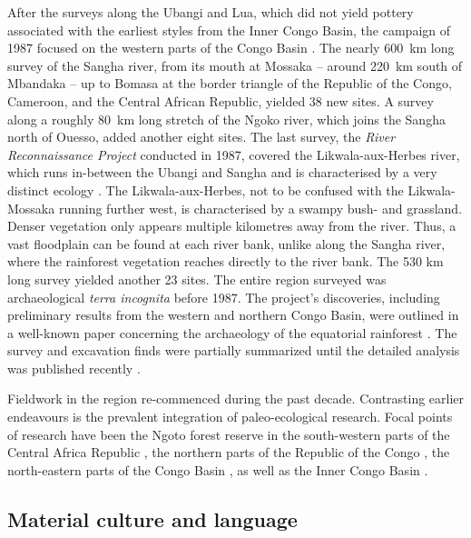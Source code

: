 \documentclass[smallextended,natbib]{svjour3}       %
\begin{document}
After the surveys along the Ubangi and Lua, which did not yield pottery associated with the earliest styles from the Inner Congo Basin, the campaign of 1987 focused on the western parts of the Congo Basin \citep[Fig.~\ref{fig:map};][]{Eggert.1992}. The nearly 600~km long survey of the Sangha river, from its mouth at Mossaka – around 220~km south of Mbandaka – up to Bomasa at the border triangle of the Republic of the Congo, Cameroon, and the Central African Republic, yielded 38 new sites. A survey along a roughly 80~km long stretch of the Ngoko river, which joins the Sangha north of Ouesso, added another eight sites. The last survey, the \textit{River Reconnaissance Project} conducted in 1987, covered the Likwala-aux-Herbes river, which runs in-between the Ubangi and Sangha and is characterised by a very distinct ecology \citep{Philippon.2019}. The Likwala-aux-Herbes, not to be confused with the Likwala-Mossaka running further west, is characterised by a swampy bush- and grassland. Denser vegetation only appears multiple kilometres away from the river. Thus, a vast floodplain can be found at each river bank, unlike along the Sangha river, where the rainforest vegetation reaches directly to the river bank. The 530 km long survey yielded another 23 sites. The entire region surveyed was archaeological \textit{terra incognita} before 1987. The project’s discoveries, including preliminary results from the western and northern Congo Basin, were outlined in a well-known paper concerning the archaeology of the equatorial rainforest \citep{Eggert.1993}. The survey and excavation finds were partially summarized \citep{Seidensticker.2016b} until the detailed analysis was published recently \citep{Seidensticker.2021e}. 

Fieldwork in the region re-commenced during the past decade. Contrasting earlier endeavours is the prevalent integration of paleo-ecological research. Focal points of research have been the Ngoto forest reserve in the south-western parts of the Central Africa Republic \citep{Kiahtipes.2011,Lupo.2015,Kiahtipes.2016,Lupo.2021}, the northern parts of the Republic of the Congo \citep{Gillet.2013,MorinRivat.2014,Morin-Rivat.2017a}, the north-eastern parts of the Congo Basin \citep{Cornelissen.2013,LivingstoneSmith.2011,LivingstoneSmith.2017}, as well as the Inner Congo Basin \citep{Neumann.2022}.

\subsection*{Material culture and language}
\end{document}
